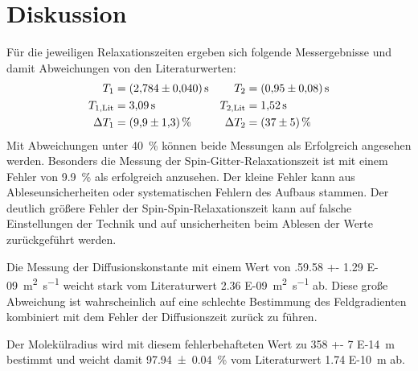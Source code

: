 \section{Diskussion}
\label{sec:Diskussion}
Für die jeweiligen Relaxationszeiten ergeben sich folgende Messergebnisse und damit Abweichungen von den Literaturwerten:
\begin{align*}
    T_1 & = \SI{2.784 +- 0.04}{\second} & T_2 & = \SI{0.95 +- 0.08}{\second}\\
    T_{1,\text{Lit}} & = \SI{3.09}{\second} & T_{2,\text{Lit}} & = \SI{1.52}{\second}\\
    \Delta T_1 & = \SI{9.9+-1.3}{\percent} & \Delta T_2 & = \SI{37+-5}{\percent}\\
\end{align*}
Mit Abweichungen unter \SI{40}{\percent} können beide Messungen als Erfolgreich angesehen werden.
Besonders die Messung der Spin-Gitter-Relaxationszeit ist mit einem Fehler von \SI{9.9}{\percent} als erfolgreich anzusehen.
Der kleine Fehler kann aus Ableseunsicherheiten oder systematischen Fehlern des Aufbaus stammen.
Der deutlich größere Fehler der Spin-Spin-Relaxationszeit kann auf falsche Einstellungen der Technik und auf unsicherheiten beim Ablesen der Werte zurückgeführt werden.

Die Messung der Diffusionskonstante mit einem Wert von .\SI{59.58 +- 1.29 E-09}{\metre \squared  \per \second} weicht stark vom Literaturwert \SI{2.36 E-09}{\metre\squared\per\second} ab.
Diese große Abweichung ist wahrscheinlich auf eine schlechte Bestimmung des Feldgradienten kombiniert mit dem Fehler der Diffusionszeit zurück zu führen.

Der Molekülradius wird mit diesem fehlerbehafteten Wert zu \SI{358 +- 7 E-14}{\metre} bestimmt und weicht damit \SI{97.94 +-0.04}{\percent} vom Literaturwert \SI{1.74 E-10}{\metre} ab.